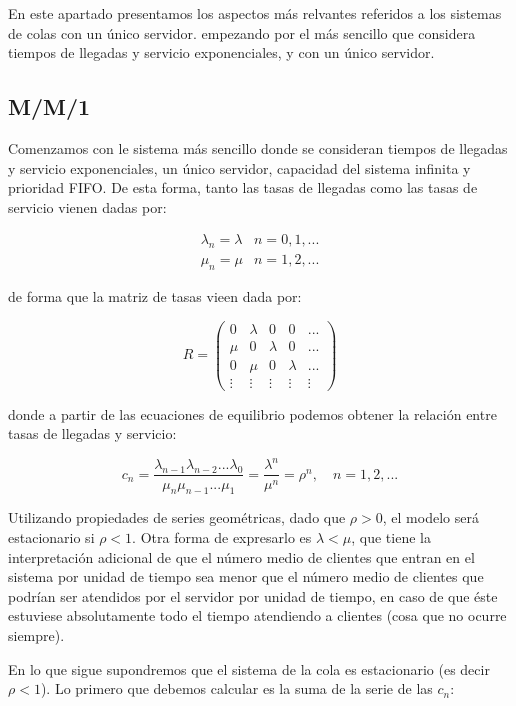 \documentclass[
]{book}
\theoremstyle{definition}
\theoremstyle{definition}
\theoremstyle{definition}
\theoremstyle{definition}
\theoremstyle{remark}
\begin{document}
En este apartado presentamos los aspectos más relvantes referidos a los sistemas de colas con un único servidor.
empezando por el más sencillo que considera tiempos de llegadas y servicio exponenciales, y con un único servidor.

\hypertarget{mm1}{%
\subsection{M/M/1}\label{mm1}}

Comenzamos con le sistema más sencillo donde se consideran tiempos de llegadas y servicio exponenciales, un único servidor, capacidad del sistema infinita y prioridad FIFO. De esta forma, tanto las tasas de llegadas como las tasas de servicio vienen dadas por:

\[
\begin{matrix}
\lambda_n = \lambda & n = 0, 1,...\\
\mu_n = \mu & n = 1, 2,...
\end{matrix}\]

de forma que la matriz de tasas vieen dada por:

\[
R = \begin{pmatrix}
 0 & \lambda & 0 & 0 & ...\\
\mu & 0 & \lambda & 0 & ...\\
0 & \mu & 0 & \lambda & ...\\
\vdots & \vdots & \vdots & \vdots & \vdots
\end{pmatrix}\]

donde a partir de las ecuaciones de equilibrio podemos obtener la relación entre tasas de llegadas y servicio:

\[c_n = \frac{\lambda_{n-1}\lambda_{n-2}...\lambda_0}{\mu_{n}\mu_{n-1}...\mu_1} = \frac{\lambda^n}{\mu^n} = \rho^n, \quad n = 1, 2,...\]

Utilizando propiedades de series geométricas, dado que \(\rho >0\), el modelo será estacionario si \(\rho < 1\). Otra forma de expresarlo es \(\lambda < \mu\), que tiene la interpretación adicional de que el número medio de clientes que entran en el sistema por unidad de tiempo sea menor que el número medio de clientes que podrían ser atendidos por el servidor por unidad de tiempo, en caso de que éste estuviese absolutamente todo el tiempo atendiendo a clientes (cosa que no ocurre siempre).

En lo que sigue supondremos que el sistema de la cola es estacionario (es decir \(\rho < 1\)). Lo primero que debemos calcular es la suma de la serie de las \(c_n\):
\end{document}
